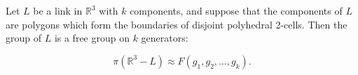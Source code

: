 Let $L$ be a link in $\mathbb{R}^3$ with $k$ components, and suppose that the components of $L$ are polygons which form the boundaries of disjoint polyhedral 2-cells. Then the group of $L$ is a free group on $k$ generators:

$$\pi(\mathbb{R}^3 - L) \approx F(g_1, g_2, \ldots, g_k).$$
